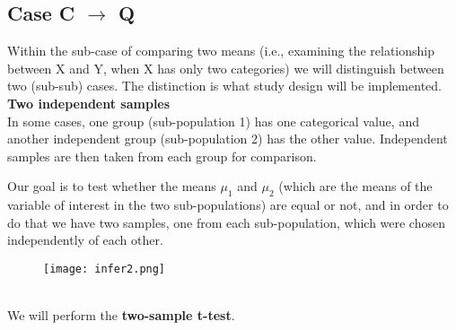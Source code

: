\documentclass[10pt, a4paper]{article}
\begin{document}
\subsection{Case C $\rightarrow$ Q}
Within the sub-case of comparing two means (i.e., examining the relationship between X and Y, when X has only two categories) we will distinguish between two (sub-sub) cases. The distinction is what study design will be implemented.  \\
\textbf{Two independent samples}\\
In some cases, one group (sub-population 1) has one categorical value, and another independent group (sub-population 2) has the other value. Independent samples are then taken from each group for comparison.\par
Our goal is to test whether the means $\mu_1$ and $\mu_2$ (which are the means of the variable of interest in the two sub-populations) are equal or not, and in order to do that we have two samples, one from each sub-population, which were chosen independently of each other. \\
\begin{figure}
[h!]
\centering
\texttt{[image: infer2.png]}
\end{figure}\\
We will perform the \textbf{two-sample t-test}.
\end{document}

